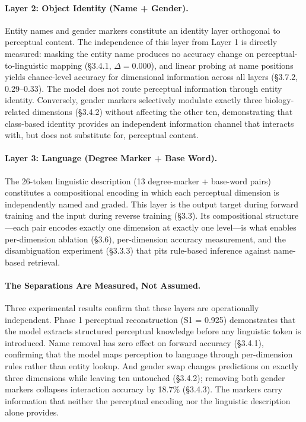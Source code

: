 \documentclass{article}
\begin{document}
\paragraph{Layer 2: Object Identity (Name + Gender).} Entity names and gender markers constitute an identity layer orthogonal to perceptual content. The independence of this layer from Layer 1 is directly measured: masking the entity name produces no accuracy change on perceptual-to-linguistic mapping (\S3.4.1, $\Delta = 0.000$), and linear probing at name positions yields chance-level accuracy for dimensional information across all layers (\S3.7.2, 0.29--0.33). The model does not route perceptual information through entity identity. Conversely, gender markers selectively modulate exactly three biology-related dimensions (\S3.4.2) without affecting the other ten, demonstrating that class-based identity provides an independent information channel that interacts with, but does not substitute for, perceptual content.

\paragraph{Layer 3: Language (Degree Marker + Base Word).} The 26-token linguistic description (13 degree-marker + base-word pairs) constitutes a compositional encoding in which each perceptual dimension is independently named and graded. This layer is the output target during forward training and the input during reverse training (\S3.3). Its compositional structure---each pair encodes exactly one dimension at exactly one level---is what enables per-dimension ablation (\S3.6), per-dimension accuracy measurement, and the disambiguation experiment (\S3.3.3) that pits rule-based inference against name-based retrieval.

\paragraph{The Separations Are Measured, Not Assumed.} Three experimental results confirm that these layers are operationally independent. Phase 1 perceptual reconstruction (S1 = 0.925) demonstrates that the model extracts structured perceptual knowledge before any linguistic token is introduced. Name removal has zero effect on forward accuracy (\S3.4.1), confirming that the model maps perception to language through per-dimension rules rather than entity lookup. And gender swap changes predictions on exactly three dimensions while leaving ten untouched (\S3.4.2); removing both gender markers collapses interaction accuracy by 18.7\% (\S3.4.3). The markers carry information that neither the perceptual encoding nor the linguistic description alone provides.
\end{document}
